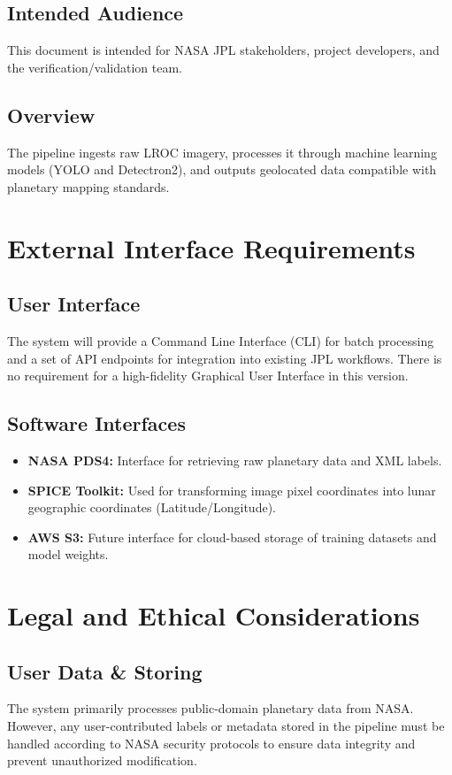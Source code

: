 \documentclass[12pt]{article}
\begin{document}
\subsection{Intended Audience}
This document is intended for NASA JPL stakeholders, project developers, and the verification/validation team.

\subsection{Overview}
The pipeline ingests raw LROC imagery, processes it through machine learning models (YOLO and Detectron2), and outputs geolocated data compatible with planetary mapping standards.

\section{External Interface Requirements}
\subsection{User Interface}
The system will provide a Command Line Interface (CLI) for batch processing and a set of API endpoints for integration into existing JPL workflows. There is no requirement for a high-fidelity Graphical User Interface in this version.

\subsection{Software Interfaces}
\begin{itemize}
    \item \textbf{NASA PDS4:} Interface for retrieving raw planetary data and XML labels.
    \item \textbf{SPICE Toolkit:} Used for transforming image pixel coordinates into lunar geographic coordinates (Latitude/Longitude).
    \item \textbf{AWS S3:} Future interface for cloud-based storage of training datasets and model weights.
\end{itemize}

\section{Legal and Ethical Considerations}
\subsection{User Data \& Storing}
The system primarily processes public-domain planetary data from NASA. However, any user-contributed labels or metadata stored in the pipeline must be handled according to NASA security protocols to ensure data integrity and prevent unauthorized modification.
\end{document}
